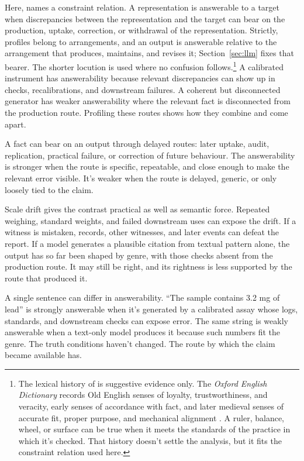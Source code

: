 \documentclass[12pt]{article}
\begin{document}
Here,  names a constraint relation. A representation is answerable
to a target when discrepancies between the representation and the target can bear on the
production, uptake, correction, or withdrawal of the representation. Strictly, profiles
belong to arrangements, and an output is answerable relative to the arrangement that
produces, maintains, and revises it; Section~\ref{sec:llm} fixes that bearer. The shorter
locution is used where no confusion follows.\footnote{The lexical
history of  is suggestive evidence only. The \textit{Oxford English
Dictionary} records Old English
senses of loyalty, trustworthiness, and veracity, early senses of accordance with fact,
and later medieval senses of accurate fit, proper purpose, and mechanical alignment
\citep{oed_true_2026}. A ruler, balance, wheel, or surface can be true when it meets the
standards of the practice in which it's checked. That history doesn't settle the
analysis, but it fits the constraint relation used here.} A
calibrated instrument has answerability because relevant discrepancies can show up in checks,
recalibrations, and downstream failures. A coherent but disconnected generator has
weaker answerability where the relevant fact is disconnected from the production route.
Profiling these routes shows how they combine and come apart.

A fact can bear on an output through delayed routes: later uptake, audit, replication,
practical failure, or correction of future behaviour. The answerability is stronger when
the route is specific, repeatable, and close enough to
make the relevant error visible. It's weaker when the route is delayed, generic, or
only loosely tied to the claim.

Scale drift gives the contrast practical as well as semantic force. Repeated weighing,
standard weights, and failed downstream uses can expose the drift. If a witness is
mistaken, records, other witnesses, and later events can defeat the report. If a model
generates a plausible citation from textual pattern alone, the output has so far been
shaped by genre, with those checks absent from the production route. It may still be
right, and its rightness is less supported by the route that produced it.

A single sentence can differ in answerability. \enquote{The sample contains
3.2 mg of lead} is strongly answerable when it's generated by a calibrated assay whose
logs, standards, and downstream checks can expose error. The same string is weakly
answerable when a text-only model produces it because such numbers fit the genre. The
truth conditions haven't changed. The route by which the claim became available has.
\end{document}

